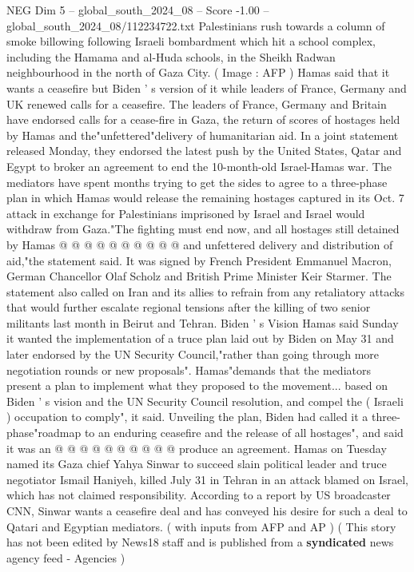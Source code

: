 \begin{textsample}{NEG Dim 5 – global\_south\_2024\_08 – Score -1.00 – global\_south\_2024\_08/112234722.txt}  \label{ex:f5_neg_127}
Palestinians rush towards a column of smoke billowing following Israeli bombardment which hit a school complex, including the Hamama and al-Huda schools, in the Sheikh Radwan neighbourhood in the north of Gaza City. ( Image : AFP ) Hamas said that it wants a ceasefire but Biden ' s version of it while leaders of France, Germany and UK renewed calls for a ceasefire.
The leaders of France, Germany and Britain have endorsed calls for a cease-fire in Gaza, the return of scores of hostages held by Hamas and the"unfettered"delivery of humanitarian aid.
In a joint statement released Monday, they endorsed the latest push by the United States, Qatar and Egypt to broker an agreement to end the 10-month-old Israel-Hamas war.
The mediators have spent months trying to get the sides to agree to a three-phase plan in which Hamas would release the remaining hostages captured in its Oct. 7 attack in exchange for Palestinians imprisoned by Israel and Israel would withdraw from Gaza."The fighting must end now, and all hostages still detained by Hamas @ @ @ @ @ @ @ @ @ @ and unfettered delivery and distribution of aid,"the statement said.
It was signed by French President Emmanuel Macron, German Chancellor Olaf Scholz and British Prime Minister Keir Starmer.
The statement also called on Iran and its allies to refrain from any retaliatory attacks that would further escalate regional tensions after the killing of two senior militants last month in Beirut and Tehran.
Biden ' s Vision Hamas said Sunday it wanted the implementation of a truce plan laid out by Biden on May 31 and later endorsed by the UN Security Council,"rather than going through more negotiation rounds or new proposals".
Hamas"demands that the mediators present a plan to implement what they proposed to the movement... based on Biden ' s vision and the UN Security Council resolution, and compel the ( Israeli ) occupation to comply", it said.
Unveiling the plan, Biden had called it a three-phase"roadmap to an enduring ceasefire and the release of all hostages", and said it was an @ @ @ @ @ @ @ @ @ @ produce an agreement.
Hamas on Tuesday named its Gaza chief Yahya Sinwar to succeed slain political leader and truce negotiator Ismail Haniyeh, killed July 31 in Tehran in an attack blamed on Israel, which has not claimed responsibility.
According to a report by US broadcaster CNN, Sinwar wants a ceasefire deal and has conveyed his desire for such a deal to Qatari and Egyptian mediators. ( with inputs from AFP and AP ) ( This story has not been edited by News18 staff and is published from a \textbf{syndicated} news agency feed - Agencies )

\end{textsample}
